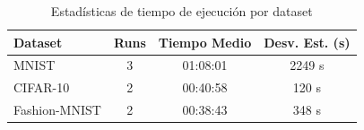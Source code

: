 \begin{table}[htbp]
\centering
\caption{Estadísticas de tiempo de ejecución por dataset}
\label{tab:reproducibilidad_tiempo}
\begin{tabular}{lccc}
\toprule
\textbf{Dataset} & \textbf{Runs} & \textbf{Tiempo Medio} & \textbf{Desv. Est. (s)} \\
\midrule
  MNIST & 3 & 01:08:01 & 2249 s \\
  CIFAR-10 & 2 & 00:40:58 & 120 s \\
  Fashion-MNIST & 2 & 00:38:43 & 348 s \\
\bottomrule
\end{tabular}
\end{table}